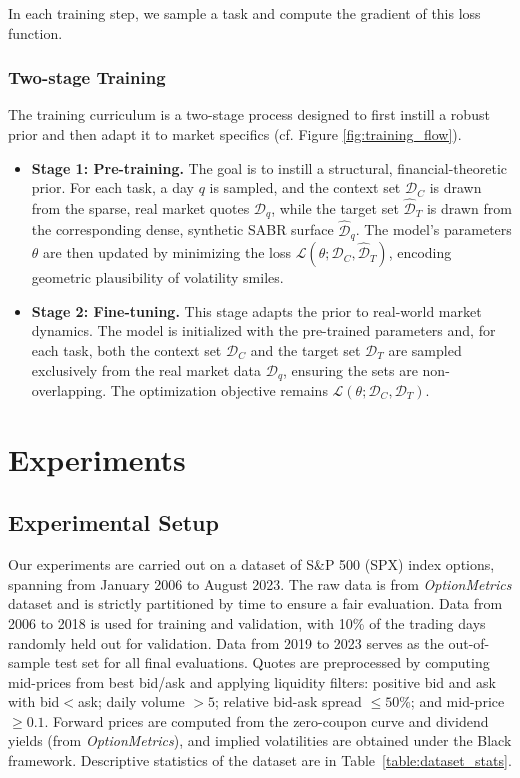 \documentclass[authoryear,preprint,review,12pt]{elsarticle}
\begin{document}
In each training step, we sample a task and compute the gradient of this loss function.

\subsubsection{Two-stage Training}

The training curriculum is a two-stage process designed to first instill a robust prior and then adapt it to market specifics (cf. Figure \ref{fig:training_flow}). 

\begin{itemize}
   \item \textbf{Stage 1: Pre-training.} The goal is to instill a structural, financial-theoretic prior. For each task, a day \(q\) is sampled, and the context set \(\mathcal{D}_{C}\) is drawn from the sparse, real market quotes \(\mathcal{D}_q\), while the target set \(\hat{\mathcal{D}}_{T}\) is drawn from the corresponding dense, synthetic SABR surface \(\hat{\mathcal{D}}_q\). The model's parameters \(\theta\) are then updated by minimizing the loss \(\mathcal{L}(\theta; \mathcal{D}_{C}, \hat{\mathcal{D}}_{T})\), encoding geometric plausibility of volatility smiles.

   \item \textbf{Stage 2: Fine-tuning.} This stage adapts the prior to real-world market dynamics. The model is initialized with the pre-trained parameters and, for each task, both the context set \(\mathcal{D}_{C}\) and the target set \(\mathcal{D}_{T}\) are sampled exclusively from the real market data \(\mathcal{D}_q\), ensuring the sets are non-overlapping. The optimization objective remains \(\mathcal{L}(\theta; \mathcal{D}_{C}, \mathcal{D}_{T})\).
\end{itemize}


\section{Experiments}
\label{sec4}

\subsection{Experimental Setup}
Our experiments are carried out on a dataset of S\&P 500 (SPX) index options, spanning from January 2006 to August 2023. The raw data is from \textit{OptionMetrics} dataset and is strictly partitioned by time to ensure a fair evaluation. Data from 2006 to 2018 is used for training and validation, with 10\% of the trading days randomly held out for validation. Data from 2019 to 2023 serves as the out-of-sample test set for all final evaluations. Quotes are preprocessed by computing mid-prices from best bid/ask and applying liquidity filters: positive bid and ask with bid$<$ask; daily volume $>5$; relative bid-ask spread $\le 50\%$; and mid-price $\ge 0.1$. Forward prices are computed from the zero-coupon curve and dividend yields (from \textit{OptionMetrics}), and implied volatilities are obtained under the Black framework. Descriptive statistics of the dataset are in Table~\ref{table:dataset_stats}.
\end{document}

